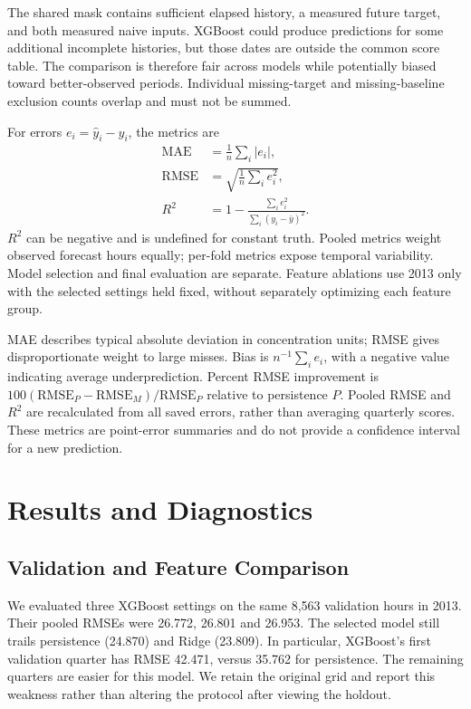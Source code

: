 \documentclass[conference]{IEEEtran}
\begin{document}
The shared mask contains sufficient elapsed history, a measured future target, and both measured naive inputs. XGBoost could produce predictions for some additional incomplete histories, but those dates are outside the common score table. The comparison is therefore fair across models while potentially biased toward better-observed periods. Individual missing-target and missing-baseline exclusion counts overlap and must not be summed.

For errors $e_i=\hat y_i-y_i$, the metrics are
\begin{align}
\mathrm{MAE}&=\frac1n\sum_i |e_i|,\\
\mathrm{RMSE}&=\sqrt{\frac1n\sum_i e_i^2},\\
R^2&=1-\frac{\sum_i e_i^2}{\sum_i(y_i-\bar y)^2}.
\end{align}
$R^2$ can be negative and is undefined for constant truth. Pooled metrics weight observed forecast hours equally; per-fold metrics expose temporal variability. Model selection and final evaluation are separate. Feature ablations use 2013 only with the selected settings held fixed, without separately optimizing each feature group.

MAE describes typical absolute deviation in concentration units; RMSE gives disproportionate weight to large misses. Bias is $n^{-1}\sum_i e_i$, with a negative value indicating average underprediction. Percent RMSE improvement is $100(\mathrm{RMSE}_{P}-\mathrm{RMSE}_{M})/\mathrm{RMSE}_{P}$ relative to persistence $P$. Pooled RMSE and $R^2$ are recalculated from all saved errors, rather than averaging quarterly scores. These metrics are point-error summaries and do not provide a confidence interval for a new prediction.

\section{Results and Diagnostics}
\subsection{Validation and Feature Comparison}
We evaluated three XGBoost settings on the same 8,563 validation hours in 2013. Their pooled RMSEs were 26.772, 26.801 and 26.953. The selected model still trails persistence (24.870) and Ridge (23.809). In particular, XGBoost's first validation quarter has RMSE 42.471, versus 35.762 for persistence. The remaining quarters are easier for this model. We retain the original grid and report this weakness rather than altering the protocol after viewing the holdout.
\end{document}
